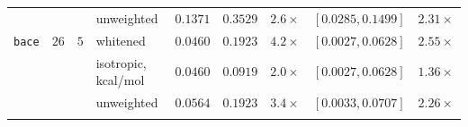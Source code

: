 \begin{table}[tp]
\begin{tabular}{@{}lrrlrrrlr@{}}
& & & unweighted & $0.1371$ & $0.3529$ & $2.6\times$ & $[0.0285,0.1499]$ & $2.31\times$ \\
\addlinespace[2pt]
\texttt{bace} & $26$ & $5$ & whitened & $0.0460$ & $0.1923$ & $4.2\times$ & $[0.0027,0.0628]$ & $2.55\times$ \\
& & & isotropic, kcal/mol & $0.0460$ & $0.0919$ & $2.0\times$ & $[0.0027,0.0628]$ & $1.36\times$ \\
& & & unweighted & $0.0564$ & $0.1923$ & $3.4\times$ & $[0.0033,0.0707]$ & $2.26\times$ \\
\addlinespace[2pt]
\bottomrule
\end{tabular}
\end{table}
